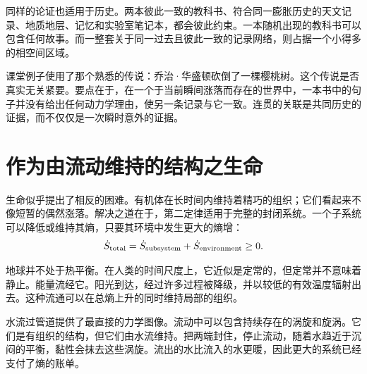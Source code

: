 同样的论证也适用于历史。两本彼此一致的教科书、符合同一膨胀历史的天文记录、地质地层、记忆和实验室笔记本，都会彼此约束。一本随机出现的教科书可以包含任何故事。而一整套关于同一过去且彼此一致的记录网络，则占据一个小得多的相空间区域。

课堂例子使用了那个熟悉的传说：乔治·华盛顿砍倒了一棵樱桃树。这个传说是否真实无关紧要。要点在于，在一个于当前瞬间涨落而存在的世界中，一本书中的句子并没有给出任何动力学理由，使另一条记录与它一致。连贯的关联是共同历史的证据，而不仅仅是一次瞬时意外的证据。

\begin{classroomqa}
\end{classroomqa}

\begin{classroomqa}
\end{classroomqa}

\section{作为由流动维持的结构之生命}

生命似乎提出了相反的困难。有机体在长时间内维持着精巧的组织；它们看起来不像短暂的偶然涨落。解决之道在于，第二定律适用于完整的封闭系统。一个子系统可以降低或维持其熵，只要其环境中发生更大的熵增：
\begin{equation}
 \dot S_{\rm total}
 =\dot S_{\rm subsystem}+\dot S_{\rm environment}\geq 0.
 \label{eq:sm8-open-system-second-law}
\end{equation}

地球并不处于热平衡。在人类的时间尺度上，它近似是定常的，但定常并不意味着静止。能量流经它。阳光到达，经过许多过程被降级，并以较低的有效温度辐射出去。这种流通可以在总熵上升的同时维持局部的组织。

水流过管道提供了最直接的力学图像。流动中可以包含持续存在的涡旋和旋涡。它们是有组织的结构，但它们由水流维持。把两端封住，停止流动，随着水趋近于沉闷的平衡，黏性会抹去这些涡旋。流出的水比流入的水更暖，因此更大的系统已经支付了熵的账单。

